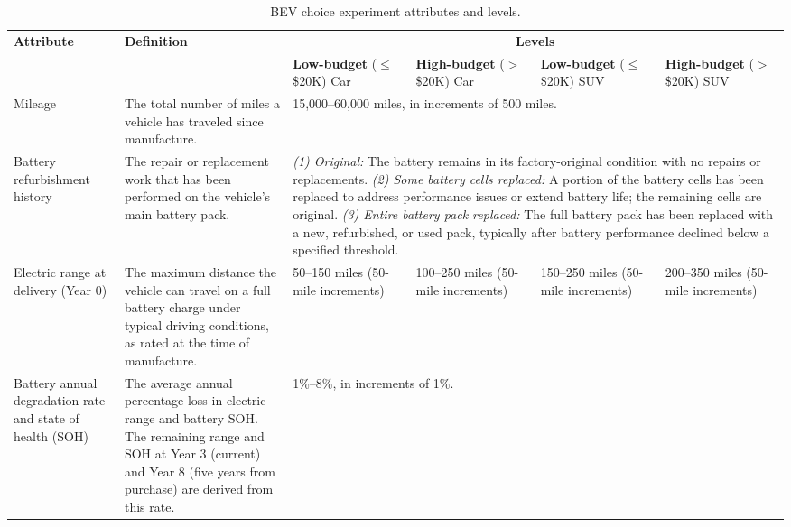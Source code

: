 \documentclass[a4paper,fleqn]{cas-sc}   %
\begin{document}
\begin{table}[pos=H]
\caption{BEV choice experiment attributes and levels.}
\label{table:dce_attributes}
\begin{adjustbox}{width=\textwidth, center}
{\renewcommand{\arraystretch}{1.4}
\begin{tabular}{p{3.2cm} p{4.8cm} p{3cm} p{3cm} p{3cm} p{3cm}}
\toprule
\multirow{2}{*}{\textbf{Attribute}} & \multirow{2}{*}{\textbf{Definition}} & \multicolumn{4}{c}{\textbf{Levels}} \\
\cmidrule(lr){3-6}
 & & \textbf{Low-budget} \newline ($\leq$\$20K) Car & \textbf{High-budget} \newline ($>$\$20K) Car & \textbf{Low-budget} \newline ($\leq$\$20K) SUV & \textbf{High-budget} \newline ($>$\$20K) SUV \\
\midrule
Mileage & The total number of miles a vehicle has traveled since manufacture. & \multicolumn{4}{p{12.5cm}}{15,000--60,000 miles, in increments of 500 miles.} \\
\addlinespace[4pt]
Battery refurbishment history & The repair or replacement work that has been performed on the vehicle's main battery pack. & \multicolumn{4}{p{12.5cm}}{%
  \textit{(1) Original:} The battery remains in its factory-original condition with no repairs or replacements.\newline
  \textit{(2) Some battery cells replaced:} A portion of the battery cells has been replaced to address performance issues or extend battery life; the remaining cells are original.\newline
  \textit{(3) Entire battery pack replaced:} The full battery pack has been replaced with a new, refurbished, or used pack, typically after battery performance declined below a specified threshold.} \\
\addlinespace[4pt]
Electric range at delivery (Year 0) & The maximum distance the vehicle can travel on a full battery charge under typical driving conditions, as rated at the time of manufacture. & 50--150 miles \newline (50-mile increments) & 100--250 miles \newline (50-mile increments) & 150--250 miles \newline (50-mile increments) & 200--350 miles \newline (50-mile increments) \\
\addlinespace[4pt]
Battery annual degradation rate and state of health (SOH) & The average annual percentage loss in electric range and battery SOH. The remaining range and SOH at Year 3 (current) and Year 8 (five years from purchase) are derived from this rate. & \multicolumn{4}{p{12.5cm}}{1\%--8\%, in increments of 1\%.} \\

\end{tabular}}
\end{adjustbox}
\end{table}
\end{document}
